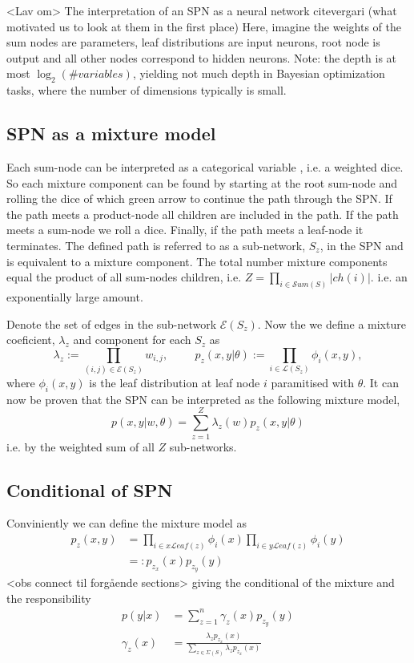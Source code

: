 \begin{note2}
     <Lav om> The interpretation of an SPN as a neural network cite{vergari} (what motivated us to look at them in the first place)
    Here, imagine the weights of the sum nodes are parameters, leaf distributions are input neurons, root node is output and
    all other nodes correspond to hidden neurons.
    Note: the depth is at most $\log_2(\# variables)$, yielding not much depth in Bayesian optimization tasks, where the number
    of dimensions typically is small. 
\end{note2}

\subsection{SPN as a mixture model}
Each sum-node can be interpreted as a categorical variable \cite{??}, i.e. a weighted dice. So each
mixture component can be found by starting at the root sum-node and rolling the dice of which green
arrow to continue the path through the SPN. If the path meets a product-node all children are
included in the path. If the path meets a sum-node we roll a dice. Finally, if the path meets a
leaf-node it terminates. The defined path is referred to as a sub-network, $S_z$, in the SPN and is
equivalent to a mixture component. The total number mixture components equal the product of all
sum-nodes children, i.e. $Z = \prod_{i\in \mathcal{S}um(S)}|ch(i)|$. i.e. an exponentially large
amount. 

Denote the set of edges in the sub-network $\mathcal{E}(S_z)$.
Now the we define a mixture coeficient, $\lambda_z$ and component for each $S_z$ as 
$$\lambda_z := \prod_{(i,j)\in \mathcal{E}(S_z)} w_{i,j}, \hspace{1cm} p_z(x,y|\theta) := \prod_{i
\in \mathcal{L}(S_z)} \phi_i(x,y),$$ where $\phi_i(x,y)$ is the leaf distribution at leaf node $i$
paramitised with $\theta$. It can now be proven that the SPN can be interpreted as the following mixture
model, 
$$p(x,y|w,\theta) = \sum_{z=1}^Z \lambda_z(w)p_z(x,y|\theta)$$
i.e. by the weighted sum of all $Z$ sub-networks. 


\subsection{Conditional of SPN}
Conviniently we can define the mixture model as 
\begin{align*}
    p_z(x,y) &= \prod_{i \in x\mathcal{L}eaf(z)} \phi_i(x)\prod_{i \in y\mathcal{L}eaf(z)} \phi_i(y)\\
            &=: p_{z_x}(x) p_{z_y}(y) 
\end{align*}
<obs connect til forgående sections> giving the conditional of the mixture and the responsibility
\begin{align}
    p(y|x) &= \sum_{z=1}^n \gamma_z(x) p_{z_y}(y)\\
    \gamma_z(x) &= \frac{ \lambda_z p_{z_x}(x)}{\sum_{z \in \Sigma(S)} \lambda_z p_{z_x}(x)}
\end{align}
